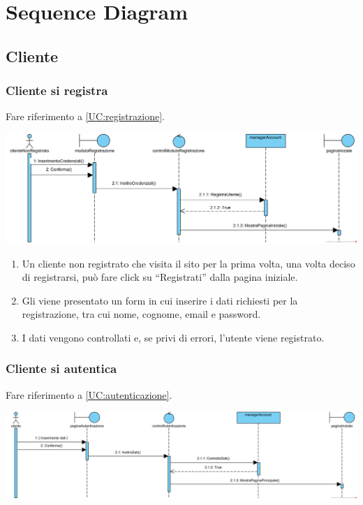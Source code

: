 \documentclass[12pt]{article}
\begin{document}
\newpage

\section{Sequence Diagram}
\subsection{Cliente}
\subsubsection{Cliente si registra}
\label{SD:registrazione}

Fare riferimento a \ref{UC:registrazione}. \\

\begin{center}
\includegraphics[width=\textwidth]{SequenceDiagram/ClienteRegistrazione}
\end{center}

\begin{enumerate}
\item Un cliente non registrato che visita il sito per la prima volta, una volta deciso di registrarsi, può fare click su ``Registrati'' dalla pagina iniziale.
\item Gli viene presentato un form in cui inserire i dati richiesti per la registrazione, tra cui nome, cognome, email e password.
\item I dati vengono controllati e, se privi di errori, l'utente viene registrato.
\end{enumerate}

\subsubsection{Cliente si autentica}
\label{SD:login}

Fare riferimento a \ref{UC:autenticazione}. \\

\begin{center}
\includegraphics[width=\textwidth]{SequenceDiagram/Autenticazione}
\end{center}
\end{document}
